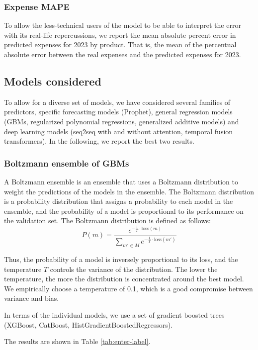 \documentclass[11pt,twocolumn]{article}
\begin{document}
\subsubsection{Expense MAPE}
To allow the less-technical users of the model to be able to interpret the error with its real-life repercussions, we report the mean absolute percent error in predicted expenses for 2023 by product. That is, the mean of the percentual absolute error between the real expenses and the predicted expenses for 2023.

\subsection{Models considered}
To allow for a diverse set of models, we have considered several families of predictors, specific forecasting models (Prophet), general regression models (GBMs, regularized polynomial regressions, generalized additive models) and deep learning models (seq2seq with and without attention, temporal fusion transformers). In the following, we report the best two results.

\subsubsection{Boltzmann ensemble of GBMs}
A Boltzmann ensemble is an ensemble that uses a Boltzmann distribution to weight the predictions of the models in the ensemble. The Boltzmann distribution is a probability distribution that assigns a probability to each model in the ensemble, and the probability of a model is proportional to its performance on the validation set. The Boltzmann distribution is defined as follows:
\begin{equation*}
	P\left( m \right) = \frac{e^{-\frac{1}{T} \cdot \text{loss}\left( m \right) }}{\sum_{m' \in M}^{} e^{-\frac{1}{T} \cdot \text{loss}\left( m' \right) }}
\end{equation*}

Thus, the probability of a model is inversely proportional to its loss, and the temperature $T$ controls the variance of the distribution. The lower the temperature, the more the distribution is concentrated around the best model. We empirically choose a temperature of 0.1, which is a good compromise between variance and bias.

In terms of the individual models, we use a set of gradient boosted trees (XGBoost, CatBoost, HistGradientBoostedRegressors).

The results are shown in Table \ref{tab:enter-label}.
\end{document}
